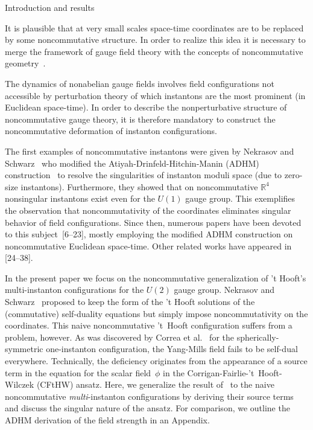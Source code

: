 \documentclass[a4paper,11pt]{article}
\makeatletter
\renewcommand{\section}{\@startsection{section}{1}{0pt}{\medskipamount}
{\medskipamount}{\large\bf}}
\numberwithin{equation}{section}
\newcommand{\R}{\mathbb R}
\makeatother
\begin{document}
\section{Introduction and results}

\noindent
It is plausible that at very small scales space-time coordinates are to
be replaced by some noncommutative structure. In order to realize this idea
it is necessary to merge the framework of gauge field theory with the
concepts of noncommutative geometry~\cite{Connes,Connes:1998cr,Seiberg:1999vs}.

The dynamics of nonabelian gauge fields involves field configurations
not accessible by perturbation theory of which instantons are the most
prominent (in Euclidean space-time). In order to describe the nonperturbative
structure of noncommutative gauge theory, it is therefore mandatory to
construct the noncommutative deformation of instanton configurations.

The first examples of noncommutative instantons were given by Nekrasov and
Schwarz~\cite{Nekrasov:1998ss} who modified the  
Atiyah-Drinfeld-Hitchin-Manin (ADHM) construction~\cite{Atiyah:1978ri} 
to resolve the singularities of instanton moduli space (due to zero-size
instantons).
{}Furthermore, they showed that on noncommutative $\R^4$ nonsingular 
instantons exist even for the $U(1)$ gauge group. This exemplifies the
observation that noncommutativity of the coordinates eliminates singular
behavior of field configurations.
Since then, numerous papers have been devoted to this subject~[6--23],
mostly employing the modified ADHM construction on noncommutative Euclidean 
space-time.  Other related works have appeared in [24--38].

In the present paper we focus on the noncommutative generalization of
't Hooft's multi-instanton configurations for the $U(2)$ gauge group.
Nekrasov and Schwarz~\cite{Nekrasov:1998ss} proposed to keep the form of the
't Hooft solutions of the (commutative) self-duality equations but simply
impose noncommutativity on the coordinates. 
This naive noncommutative 't~Hooft configuration suffers from a problem, 
however. As was discovered by Correa et al.~\cite{Correa:2001wv} for 
the spherically-symmetric one-instanton configuration,
the Yang-Mills field fails to be self-dual everywhere.
Technically, the deficiency originates from the appearance of a source term
in the equation for the scalar field~$\phi$ in the 
Corrigan-Fairlie-'t~Hooft-Wilczek (CFtHW) ansatz.
Here, we generalize the result of~\cite{Correa:2001wv} 
to the naive noncommutative {\it multi\/}-instanton configurations 
by deriving their source terms and discuss the singular nature of the ansatz.
For comparison, we outline the ADHM derivation of the field strength 
in an Appendix.
\end{document}
